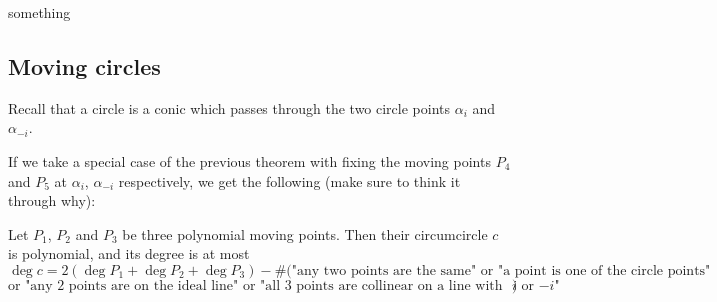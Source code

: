 \documentclass[a4paper]{article}
\begin{document}
\begin{example}
    something
\end{example}

\subsection{Moving circles}

Recall that a circle is a conic which passes through the two circle points $\alpha_i$ and $\alpha_{-i}$.

If we take a special case of the previous theorem with fixing the moving points $P_4$ and $P_5$ at $\alpha_i$, $\alpha_{-i}$ respectively, we get the following (make sure to think it through why):

\begin{theorem}
    Let $P_1$, $P_2$ and $P_3$ be three polynomial moving points. Then their circumcircle $c$ is polynomial, and its degree is at most
    $$\deg c= 2(\deg P_1+\deg P_2+\deg P_3)-\#(\text{"any two points are the same" or "a point is one of the circle points"}$$
    $$\text{or "any 2 points are on the ideal line" or "all 3 points are collinear on a line with slope $i$ or $-i$"})$$
\end{theorem}
\end{document}
